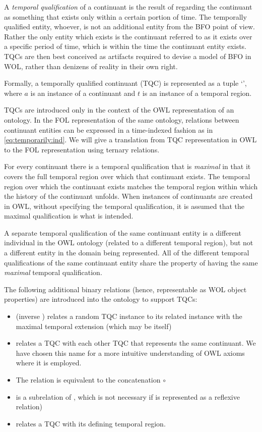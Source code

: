 
A \emph{temporal qualification} of a
continuant is the result of regarding the continuant as something that exists only
within a certain portion of time. The temporally qualified entity, whoever, is
not an additional entity from the BFO point of view. 
Rather the only entity which exists is the continuant referred to as it exists 
over a specific period of time, which is within the time the continuant entity
exists. TQCs are then best conceived as artifacts required to devise a model of BFO in WOL, rather than denizens of reality in their own right.

Formally, a temporally qualified continuant (TQC) is represented as a tuple `',
where $a$ is an instance
of a continuant and $t$ is an instance of a temporal region.

TQCs are introduced only in the context of the OWL representation of
an ontology. In the FOL representation of the same ontology, relations between continuant 
entities can be expressed in a time-indexed fashion
as in \ref{eq:temporarily:ind}. 
We will give a translation from TQC representation in OWL to the
FOL representation using ternary relations.

For every continuant there is a temporal qualification that is \textit{maximal} 
in that it covers the full temporal region over which that continuant exists. 
The temporal region over which the continuant exists matches the temporal region 
within which the history of the continuant unfolds. When instances of continuants 
are created in OWL, without specifying the temporal qualification, 
it is assumed that the maximal qualification is what is intended.

A separate temporal qualification of the same continuant entity is 
a different individual in the OWL ontology (related to a different 
temporal region), but not a different entity in the domain being 
represented. All of the different temporal qualifications of the 
same continuant entity share the property of having the same \emph{maximal} 
temporal qualification.

The following additional binary relations (hence, representable as WOL object properties) 
are introduced into the ontology to support 
TQCs:
\begin{itemize}
    \item {} (inverse ) relates a random TQC instance to its related instance 
    with the maximal temporal extension (which may be itself)
    \item {} relates a TQC with each other TQC that represents the same continuant. We have
    chosen this name for a more intuitive understanding of OWL axioms where it is employed.
    \item The relation  is equivalent to the concatenation  $\circ$ 
    \item {} is a subrelation of , which is not necessary if  is represented as a 
    reflexive relation)
    \item {} relates a TQC with its defining temporal region.
\end{itemize}


